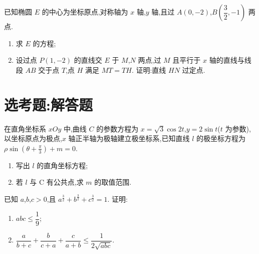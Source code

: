 \begin{problem}
已知椭圆 \(E\) 的中心为坐标原点,对称轴为 \(x\) 轴,\(y\) 轴,且过 \(A(0,-2)\),\(B\left(\dfrac32,-1\right)\) 两点.

\begin{enumerate}
\item 求 \(E\) 的方程;

\item 设过点 \(P(1,-2)\) 的直线交 \(E\) 于 \(M\),\(N\) 两点,过 \(M\) 且平行于 \(x\) 轴的直线与线段 \(AB\) 交于点 \(T\),点 \(H\) 满足 \(MT=TH\). 证明:直线 \(HN\) 过定点.
\end{enumerate}
\end{problem}

\section{选考题:解答题}

\begin{problem}
在直角坐标系 \(xOy\) 中,曲线 \(C\) 的参数方程为 \(x=\sqrt3\cos2t\),\(y=2\sin t\)(\(t\) 为参数),以坐标原点为极点,\(x\) 轴正半轴为极轴建立极坐标系,已知直线 \(l\) 的极坐标方程为 \(\rho\sin\left(\theta+\frac{\pi}{3}\right)+m=0\).

\begin{enumerate}
\item 写出 \(l\) 的直角坐标方程;
\item 若 \(l\) 与 C 有公共点,求 \(m\) 的取值范围.
\end{enumerate}
\end{problem}

\begin{problem}
已知 \(a\),\(b\),\(c>0\),且 \(a^{\frac32}+b^{\frac32}+c^{\frac32}=1\). 证明:

\begin{enumerate}
\item \(abc\le\dfrac19\);
\item \(\dfrac{a}{b+c}+\dfrac{b}{c+a}+\dfrac{c}{a+b}\le\dfrac{1}{2\sqrt{abc}}\).
\end{enumerate}
\end{problem}


